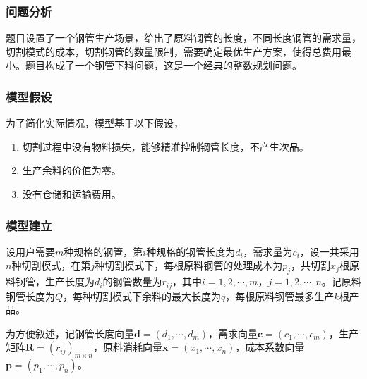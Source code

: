 
\subsubsection{问题分析}

题目设置了一个钢管生产场景，给出了原料钢管的长度，不同长度钢管的需求量，切割模式的成本，切割钢管的数量限制，需要确定最优生产方案，使得总费用最小。题目构成了一个钢管下料问题，这是一个经典的整数规划问题。

\subsubsection{模型假设}

为了简化实际情况，模型基于以下假设，
\begin{enumerate}
    \item 切割过程中没有物料损失，能够精准控制钢管长度，不产生次品。
    \item 生产余料的价值为零。
    \item 没有仓储和运输费用。
\end{enumerate}

\subsubsection{模型建立}

设用户需要$m$种规格的钢管，第$i$种规格的钢管长度为$d_i$，需求量为$c_i$，设一共采用$n$种切割模式，在第$j$种切割模式下，每根原料钢管的处理成本为$p_j$，共切割$x_j$根原料钢管，生产长度为$d_i$的钢管数量为$r_{ij}$，其中$i=1,2,\cdots,m$，$j=1,2,\cdots,n$。记原料钢管长度为$Q$，每种切割模式下余料的最大长度为$q$，每根原料钢管最多生产$k$根产品。

为方便叙述，记钢管长度向量$\mathbf{d} = (d_1,\cdots,d_m)$，需求向量$\mathbf{c} = (c_1,\cdots,c_m)$，生产矩阵$\mathbf{R} = (r_{ij})_{m \times n}$，原料消耗向量$\mathbf{x} = (x_1, \cdots, x_n)$，成本系数向量$\mathbf{p} = (p_1,\cdots,p_n)$。


